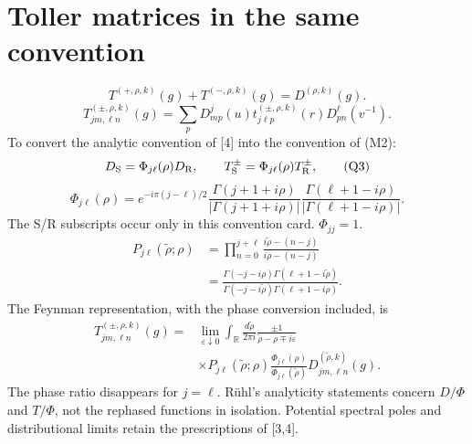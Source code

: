 \documentclass[11pt,a4paper]{article}
\newcommand{\eq}[2]{\begin{equation}#2\tag{#1}\end{equation}}
\begin{document}
\section{Toller matrices in the same convention}
\eq{Q1}{\boxed{T^{(+,\rho,k)}(g)+T^{(-,\rho,k)}(g)=D^{(\rho,k)}(g).}}
\eq{Q2}{T^{(\pm,\rho,k)}_{jm,\ell n}(g)=\sum_pD^j_{mp}(u)t^{(\pm,\rho,k)}_{j\ell p}(r)D^\ell_{pn}(v^{-1}).}
To convert the analytic convention of [4] into the convention of (M2):
\eq{Q3}{D_{\rm S}=\Phi_{j\ell}(\rho)D_{\rm R},\qquad T^\pm_{\rm S}=\Phi_{j\ell}(\rho)T^\pm_{\rm R},}
\eq{Q4}{\Phi_{j\ell}(\rho)=e^{-i\pi(j-\ell)/2}\frac{\Gamma(j+1+i\rho)}{|\Gamma(j+1+i\rho)|}\frac{\Gamma(\ell+1-i\rho)}{|\Gamma(\ell+1-i\rho)|}.}
The S/R subscripts occur only in this convention card. $\Phi_{jj}=1$.
\eq{Q5}{\begin{aligned}
P_{j\ell}(\widetilde\rho;\rho)&=\prod_{n=0}^{j+\ell}\frac{i\widetilde\rho-(n-j)}{i\rho-(n-j)}\\
&=\frac{\Gamma(-j-i\rho)\Gamma(\ell+1-i\widetilde\rho)}{\Gamma(-j-i\widetilde\rho)\Gamma(\ell+1-i\rho)}.
\end{aligned}}
The Feynman representation, with the phase conversion included, is
\eq{Q6}{\boxed{\begin{aligned}
T^{(\pm,\rho,k)}_{jm,\ell n}(g)={}&\lim_{\varepsilon\downarrow0}\int_{\mathbb R}\frac{d\widetilde\rho}{2\pi i}\frac{\pm1}{\widetilde\rho-\rho\mp i\varepsilon}\\
&\times P_{j\ell}(\widetilde\rho;\rho)\frac{\Phi_{j\ell}(\rho)}{\Phi_{j\ell}(\widetilde\rho)}D^{(\widetilde\rho,k)}_{jm,\ell n}(g).
\end{aligned}}}
The phase ratio disappears for $j=\ell$. R\"uhl's analyticity statements concern $D/\Phi$ and $T/\Phi$, not the rephased functions in isolation. Potential spectral poles and distributional limits retain the prescriptions of [3,4].
\end{document}
